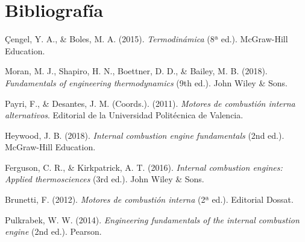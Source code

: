 \documentclass{article}
\begin{document}
    \section{Bibliografía}

    Çengel, Y. A., \& Boles, M. A. (2015). \emph{Termodinámica} (8ª ed.). McGraw-Hill Education.

    Moran, M. J., Shapiro, H. N., Boettner, D. D., \& Bailey, M. B. (2018). \emph{Fundamentals of engineering thermodynamics} (9th ed.). John Wiley \& Sons.

    Payri, F., \& Desantes, J. M. (Coords.). (2011). \emph{Motores de combustión interna alternativos}. Editorial de la Universidad Politécnica de Valencia.

    Heywood, J. B. (2018). \emph{Internal combustion engine fundamentals} (2nd ed.). McGraw-Hill Education.

    Ferguson, C. R., \& Kirkpatrick, A. T. (2016). \emph{Internal combustion engines: Applied thermosciences} (3rd ed.). John Wiley \& Sons.

    Brunetti, F. (2012). \emph{Motores de combustión interna} (2ª ed.). Editorial Dossat.

    Pulkrabek, W. W. (2014). \emph{Engineering fundamentals of the internal combustion engine} (2nd ed.). Pearson.
\end{document}
